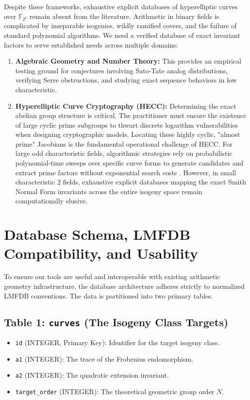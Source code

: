 \documentclass[letterpaper, 11pt]{article}
\begin{document}
Despite these frameworks, exhaustive explicit databases of hyperelliptic curves over $\mathbb{F}_{2^k}$ remain absent from the literature. Arithmetic in binary fields is complicated by inseparable isogenies, wildly ramified covers, and the failure of standard polynomial algorithms. We need a verified database of exact invariant factors to serve established needs across multiple domains:
\begin{enumerate}
    \item \textbf{Algebraic Geometry and Number Theory:} This provides an empirical testing ground for conjectures involving Sato-Tate analog distributions, verifying Serre obstructions, and studying exact sequence behaviors in low characteristic.
    \item \textbf{Hyperelliptic Curve Cryptography (HECC):} Determining the exact abelian group structure is critical. The practitioner must ensure the existence of large cyclic prime subgroups to thwart discrete logarithm vulnerabilities when designing cryptographic models. Locating these highly cyclic, "almost prime" Jacobians is the fundamental operational challenge of HECC. For large odd characteristic fields, algorithmic strategies rely on probabilistic polynomial-time sweeps over specific curve forms to generate candidates and extract prime factors without exponential search costs \cite{Satoh2008}. However, in small characteristic 2 fields, exhaustive explicit databases mapping the exact Smith Normal Form invariants across the entire isogeny space remain computationally elusive.
\end{enumerate}

\section{Database Schema, LMFDB Compatibility, and Usability}
To ensure our tools are useful and interoperable with existing arithmetic geometry infrastructure, the database architecture adheres strictly to normalized LMFDB conventions. The data is partitioned into two primary tables.

\subsection{Table 1: \texttt{curves} (The Isogeny Class Targets)}
\begin{itemize}
    \item \texttt{id} (INTEGER, Primary Key): Identifier for the target isogeny class.
    \item \texttt{a1} (INTEGER): The trace of the Frobenius endomorphism.
    \item \texttt{a2} (INTEGER): The quadratic extension invariant.
    \item \texttt{target\_order} (INTEGER): The theoretical geometric group order $N$.
\end{itemize}
\end{document}

